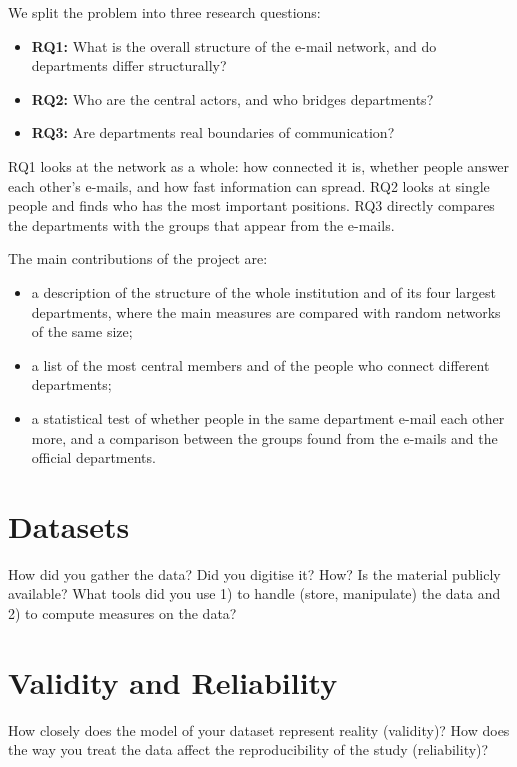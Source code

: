 \documentclass[12pt, a4paper]{article}
\begin{document}
We split the problem into three research questions:
\begin{itemize}
  \item \textbf{RQ1:} What is the overall structure of the e-mail network, and
        do departments differ structurally?
  \item \textbf{RQ2:} Who are the central actors, and who bridges departments?
  \item \textbf{RQ3:} Are departments real boundaries of communication?
\end{itemize}

RQ1 looks at the network as a whole: how connected it is, whether people answer
each other's e-mails, and how fast information can spread. RQ2 looks at single
people and finds who has the most important positions. RQ3 directly compares
the departments with the groups that appear from the e-mails.

The main contributions of the project are:
\begin{itemize}
  \item a description of the structure of the whole institution and of its four
        largest departments, where the main measures are compared with random
        networks of the same size;
  \item a list of the most central members and of the people who connect
        different departments;
  \item a statistical test of whether people in the same department e-mail each
        other more, and a comparison between the groups found from the e-mails
        and the official departments.
\end{itemize}

\section{Datasets}
\label{datasets}

How did you gather the data? Did you digitise it? How? Is the material
publicly available? What tools did you use 1) to handle (store,
manipulate) the data and 2) to compute measures on the data?

\section{Validity and Reliability}
\label{validity-and-reliability-not-needed-for-the-project-proposal}

How closely does the model of your dataset represent reality (validity)?
How does the way you treat the data affect the reproducibility of the study (reliability)?
\end{document}
